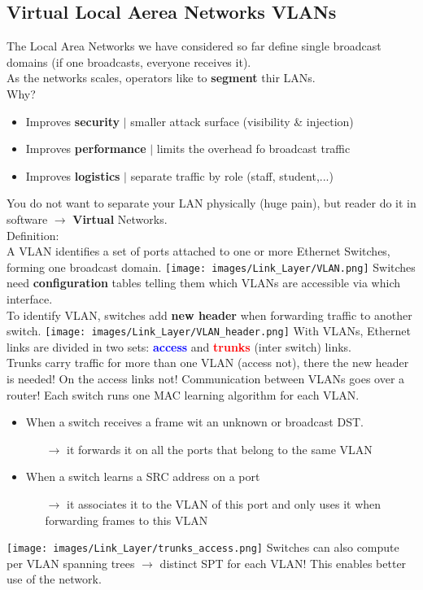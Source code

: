\documentclass[a4paper, fontsize=8pt, landscape, DIV=1]{scrartcl}
\begin{document}
\begin{multicols*}{4}
   		\subsection{Virtual Local Aerea Networks VLANs}
   		The Local Area Networks we have considered so far define single broadcast domains (if one broadcasts, everyone receives it).\\
   		As the networks scales, operators like to \textbf{segment} thir LANs.\\
   		Why?
   		\begin{itemize}[noitemsep]
   			\item Improves \textbf{security} $\vert$ smaller attack surface (visibility \& injection)
   			\item Improves \textbf{performance} $\vert$ limits the overhead fo broadcast traffic 
   			\item Improves \textbf{logistics} $\vert$ separate traffic by role (staff, student,...)
   		\end{itemize} 
   		You do not want to separate your LAN physically (huge pain), but reader do it in software $\rightarrow$ \textbf{Virtual} Networks.\\
   		Definition:\\
   		A VLAN identifies a set of ports attached to one or more Ethernet Switches, forming one broadcast domain. 
   		\texttt{[image: images/Link\_Layer/VLAN.png]}
   		Switches need \textbf{configuration} tables telling them which VLANs are accessible via which interface.\\
   		To identify VLAN, switches add \textbf{new header} when forwarding traffic to another switch.  
   		\texttt{[image: images/Link\_Layer/VLAN\_header.png]}
   		With VLANs, Ethernet links are divided in two sets: \textcolor{Blue}{\textbf{access}} and \textcolor{Red}{\textbf{trunks}} (inter switch) links.\\
   		Trunks carry traffic for more than one VLAN (access not), there the new header is needed! On the access links not! Communication between VLANs goes over a router!
   		Each switch runs one MAC learning algorithm for each VLAN.
   		\begin{itemize}[noitemsep]
   			\item When a switch receives a frame wit an unknown or broadcast DST.
   			\begin{itemize}
   				\item [$\rightarrow$]	it forwards it on all the ports that belong to the same VLAN
   			\end{itemize}
   		\columnbreak
   			\item  When a switch learns a SRC address on a port
   			\begin{itemize}
   				\item [$\rightarrow$] it associates it to the VLAN of this port and only uses it when forwarding frames to this VLAN	
   			\end{itemize}
   		\end{itemize}
  		\texttt{[image: images/Link\_Layer/trunks\_access.png]}
   		Switches can also compute per VLAN spanning trees $\rightarrow$ distinct SPT for each VLAN! This enables better use of the network. 
   		

\end{multicols*}
\end{document}
